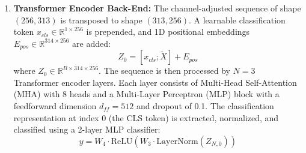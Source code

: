 \documentclass[12pt,a4paper]{report}
\begin{document}
\begin{enumerate}
    \item \textbf{Transformer Encoder Back-End:} The channel-adjusted sequence of shape $(256, 313)$ is transposed to shape $(313, 256)$. A learnable classification token $x_{cls} \in \mathbb{R}^{1 \times 256}$ is prepended, and 1D positional embeddings $E_{pos} \in \mathbb{R}^{314 \times 256}$ are added:
    \begin{equation}
        Z_0 = [x_{cls}; \tilde{X}] + E_{pos}
    \end{equation}
    where $Z_0 \in \mathbb{R}^{B \times 314 \times 256}$. The sequence is then processed by $N = 3$ Transformer encoder layers. Each layer consists of Multi-Head Self-Attention (MHA) with 8 heads and a Multi-Layer Perceptron (MLP) block with a feedforward dimension $d_{ff} = 512$ and dropout of 0.1. The classification representation at index 0 (the CLS token) is extracted, normalized, and classified using a 2-layer MLP classifier:
    \begin{equation}
        y = W_4 \cdot \text{ReLU}(W_3 \cdot \text{LayerNorm}(Z_{N, 0}))
    \end{equation}
\end{enumerate}
\end{document}
